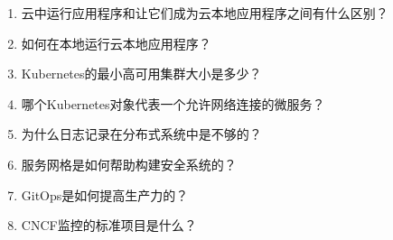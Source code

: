 \begin{enumerate}
\item
云中运行应用程序和让它们成为云本地应用程序之间有什么区别？

\item
如何在本地运行云本地应用程序？

\item
Kubernetes的最小高可用集群大小是多少？

\item
哪个Kubernetes对象代表一个允许网络连接的微服务？

\item
为什么日志记录在分布式系统中是不够的？

\item
服务网格是如何帮助构建安全系统的？

\item
GitOps是如何提高生产力的？

\item
CNCF监控的标准项目是什么？
\end{enumerate}